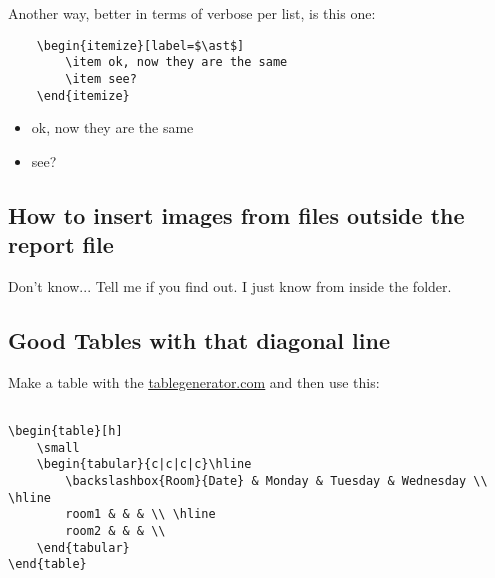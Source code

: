\par Another way, better in terms of verbose per list, is this one:
\begin{lstlisting}[language=Tex]
    %requires \usepackage{enumitem}
    \begin{itemize}[label=$\ast$]
        \item ok, now they are the same
        \item see?
    \end{itemize}
\end{lstlisting}
\begin{itemize}[label=$\ast$]
    \item ok, now they are the same
    \item see?
\end{itemize}








\subsection{How to insert images from files outside the report file}
\par Don't know... Tell me if you find out. I just know from inside the folder.











\subsection{Good Tables with that diagonal line}
\par Make a table with the \href{www.tablegenerator.com}{\ul{tablegenerator.com}} and then use this:
\begin{lstlisting}[language=Tex]
    %uses \usepackage{diagbox}

\begin{table}[h]
    \small
    \begin{tabular}{c|c|c|c}\hline
        \backslashbox{Room}{Date} & Monday & Tuesday & Wednesday \\ \hline
        room1 & & & \\ \hline
        room2 & & & \\
    \end{tabular}
\end{table}
\end{lstlisting}


